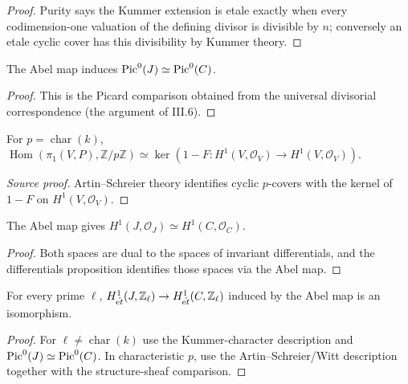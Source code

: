 \begin{proof}

Purity says the Kummer extension is etale exactly when every codimension-one
valuation of the defining divisor is divisible by $n$; conversely an etale
cyclic cover has this divisibility by Kummer theory.

\end{proof}


\begin{lemma}
\label{lem:milne-picard-comparison-source}

The Abel map induces $\operatorname{Pic}^0(J)\simeq\operatorname{Pic}^0(C)$.
\end{lemma}

\begin{proof}
 This is the Picard comparison obtained from the universal
divisorial correspondence (the argument of III.6).
\end{proof}


\begin{lemma}
\label{lem:milne-characteristic-p-characters-source}

For $p=\operatorname{char}(k)$,
$\operatorname{Hom}(\pi_1(V,P),\mathbb Z/p\mathbb Z)
\simeq\ker(1-F:H^1(V,\mathcal O_V)\to H^1(V,\mathcal O_V))$.
\end{lemma}
\begin{proof}[Source proof]
Artin--Schreier theory identifies cyclic $p$-covers with the kernel of
$1-F$ on $H^1(V,\mathcal O_V)$.
\end{proof}

\begin{lemma}
\label{lem:milne-structure-cohomology-source}

The Abel map gives $H^1(J,\mathcal O_J)\simeq H^1(C,\mathcal O_C)$.
\end{lemma}
\begin{proof}
Both spaces are dual to the spaces of invariant differentials, and the
differentials proposition identifies those spaces via the Abel map.
\end{proof}

\begin{corollary}
\label{cor:milne-etale-cohomology-comparison-source}

For every prime $\ell$, $H^1_{\acute{\mathrm{e}t}}(J,\mathbb Z_\ell)\to
H^1_{\acute{\mathrm{e}t}}(C,\mathbb Z_\ell)$ induced by the Abel map is an isomorphism.
\end{corollary}
\begin{proof}
For $\ell\ne\operatorname{char}(k)$ use the Kummer-character description and
$\operatorname{Pic}^0(J)\simeq\operatorname{Pic}^0(C)$.  In characteristic $p$, use the
Artin--Schreier/Witt description together with the structure-sheaf comparison.
\end{proof}

